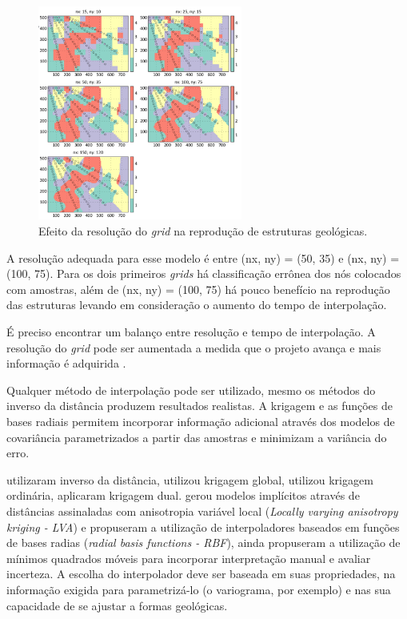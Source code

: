 \begin{figure}[H]
	\centering
	\caption{\label{grid_res}Efeito da resolução do \textit{grid} na reprodução de estruturas geológicas.}
	\includegraphics[width=0.6\textwidth]{capitulo_2/imagens/grid_res.png}
\end{figure}

A resolução adequada para esse modelo é entre (nx, ny) = (50, 35) e (nx, ny) = (100, 75). Para os dois primeiros \textit{grids} há classificação errônea dos nós colocados com amostras, além de (nx, ny) = (100, 75) há pouco benefício na reprodução das estruturas levando em consideração o aumento do tempo de interpolação.

É preciso encontrar um balanço entre resolução e tempo de interpolação. A resolução do \textit{grid} pode ser aumentada a medida que o projeto avança e mais informação é adquirida \cite{martin2017implicitmodeling}.

Qualquer método de interpolação pode ser utilizado, mesmo os métodos do inverso da distância produzem resultados realistas. A krigagem e as funções de bases radiais permitem incorporar informação adicional através dos modelos de covariância parametrizados a partir das amostras e minimizam a variância do erro.

 utilizaram inverso da distância,  utilizou krigagem  global,  utilizou krigagem ordinária,  aplicaram krigagem dual.  gerou modelos implícitos através de distâncias assinaladas com anisotropia variável local (\textit{Locally varying anisotropy kriging - LVA}) e  propuseram a utilização de interpoladores baseados em funções de bases radias (\textit{radial basis functions - RBF}),  ainda propuseram a utilização de mínimos quadrados móveis para incorporar interpretação manual e avaliar incerteza. A escolha do interpolador deve ser baseada em suas propriedades, na informação exigida para parametrizá-lo (o variograma, por exemplo) e nas sua capacidade de se ajustar a formas geológicas.

